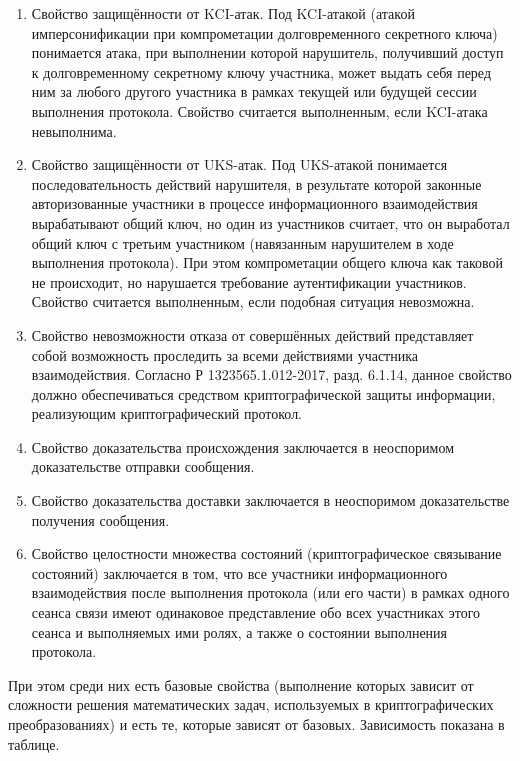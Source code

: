\begin{enumerate}
	\item Свойство защищённости от KCI-атак. Под KCI-атакой (атакой имперсонификации при компрометации долговременного секретного ключа) понимается атака, при выполнении которой нарушитель, получивший доступ к долговременному секретному ключу участника, может выдать себя перед ним за любого другого участника в рамках текущей или будущей сессии выполнения протокола. Свойство считается выполненным, если KCI-атака невыполнима.
	
	\item Свойство защищённости от UKS-атак. Под UKS-атакой понимается последовательность действий нарушителя, в результате которой законные авторизованные участники в процессе информационного взаимодействия вырабатывают общий ключ, но один из участников считает, что он выработал общий ключ с третьим участником (навязанным нарушителем в ходе выполнения протокола). При этом компрометации общего ключа как таковой не происходит, но нарушается требование аутентификации участников. Свойство считается выполненным, если подобная ситуация невозможна.
	
	\item Свойство невозможности отказа от совершённых действий представляет собой возможность проследить за всеми действиями участника взаимодействия. Согласно Р 1323565.1.012-2017, разд. 6.1.14, данное свойство должно обеспечиваться средством криптографической защиты информации, реализующим криптографический протокол.
	
	\item Свойство доказательства происхождения заключается в неоспоримом доказательстве отправки сообщения.
	
	\item Свойство доказательства доставки заключается в неоспоримом доказательстве получения сообщения.
	
	\item Свойство целостности множества состояний (криптографическое связывание состояний) заключается в том, что все участники информационного взаимодействия после выполнения протокола (или его части) в рамках одного сеанса связи имеют одинаковое представление обо всех участниках этого сеанса и выполняемых ими ролях, а также о состоянии выполнения протокола.
\end{enumerate}

При этом среди них есть базовые свойства (выполнение которых зависит от сложности решения математических задач, используемых в криптографических преобразованиях)  и есть те, которые зависят от базовых. Зависимость показана в таблице.


